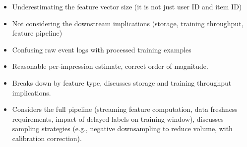\begin{interviewq}
\redflags
\begin{itemize}
    \item Underestimating the feature vector size (it is not just user ID and item ID)
    \item Not considering the downstream implications (storage, training throughput, feature pipeline)
    \item Confusing raw event logs with processed training examples
\end{itemize}


\goodgreat
\begin{itemize}
    \item {} Reasonable per-impression estimate, correct order of magnitude.
    \item {} Breaks down by feature type, discusses storage and training throughput implications.
    \item {} Considers the full pipeline (streaming feature computation, data freshness requirements, impact of delayed labels on training window), discusses sampling strategies (e.g., negative downsampling to reduce volume, with calibration correction).
\end{itemize}

\end{interviewq}


